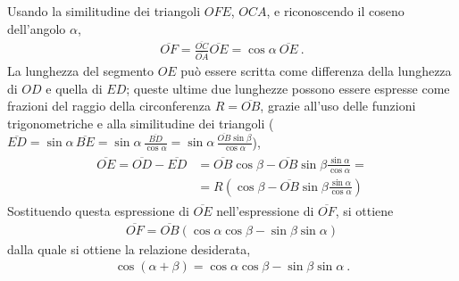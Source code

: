 \documentclass[letterpaper,10pt,italian]{jupyterBook}
\begin{document}
\sphinxAtStartPar
Usando la similitudine dei triangoli \(OFE\), \(OCA\), e riconoscendo il coseno dell’angolo \(\alpha\),
\begin{equation*}
\begin{split}\overline{OF} = \frac{\overline{OC}}{\overline{OA}} \overline{OE} = \cos \alpha \ \overline{OE} \ .\end{split}
\end{equation*}
\sphinxAtStartPar
La lunghezza del segmento \(OE\) può essere scritta come differenza della lunghezza di \(OD\) e quella di \(ED\); queste ultime due lunghezze possono essere espresse come frazioni del raggio della circonferenza \(R = \overline{OB}\), grazie all’uso delle funzioni trigonometriche e alla similitudine dei triangoli (\(\overline{ED} = \sin \alpha \, \overline{BE} = \sin \alpha \, \frac{\overline{BD}}{\cos \alpha} = \sin \alpha \, \frac{\overline{OB} \sin \beta}{\cos \alpha}\)),
\begin{equation*}
\begin{split}\begin{aligned}
\overline{OE} = \overline{OD} - \overline{ED} & = \overline{OB} \cos \beta - \overline{OB} \sin \beta \frac{\sin \alpha}{\cos \alpha} = \\
& = R \left( \cos \beta - \overline{OB} \sin \beta \frac{\sin \alpha}{\cos \alpha} \right)
\end{aligned}\end{split}
\end{equation*}
\sphinxAtStartPar
Sostituendo questa espressione di \(\overline{OE}\) nell’espressione di \(\overline{OF}\), si ottiene
\begin{equation*}
\begin{split}\overline{OF} = \overline{OB} \left( \cos \alpha \cos \beta - \sin \beta \sin \alpha  \right)\end{split}
\end{equation*}
\sphinxAtStartPar
dalla quale si ottiene la relazione desiderata,
\begin{equation*}
\begin{split}\cos (\alpha + \beta) = \cos \alpha \cos \beta - \sin \beta \sin \alpha \ .\end{split}
\end{equation*}\label{ch/trigonometry:trigonometry:cos2x}
\end{document}
